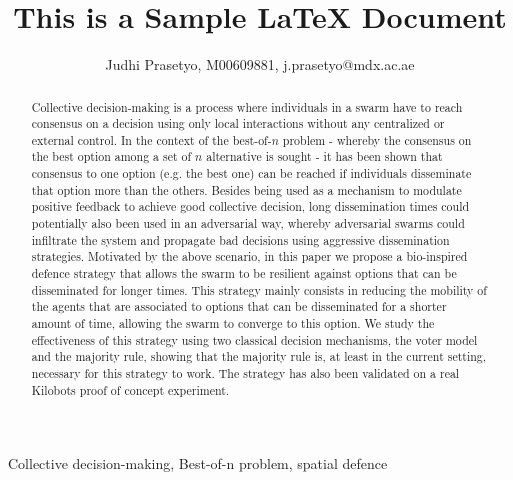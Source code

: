 \documentclass[journal]{IEEEtran}
\begin{document}
\title{This is a Sample LaTeX Document}

\author{Judhi Prasetyo, M00609881, j.prasetyo@mdx.ac.ae}


\maketitle

\begin{abstract}
Collective decision-making is a process where individuals in a swarm have to reach consensus on a decision using only local interactions without any centralized or external control. In the context of the best-of-$n$ problem - whereby the consensus on the best option among a set of $n$ alternative is sought - it has been shown that consensus to one option (e.g. the best one) can be reached if individuals disseminate that option more than the others.
Besides being used as a mechanism to modulate positive feedback to achieve good collective decision, long dissemination times could potentially also been used in an adversarial way, whereby adversarial swarms could infiltrate the system and propagate bad decisions using aggressive dissemination strategies. Motivated by the above scenario, in this paper we propose a bio-inspired defence strategy that allows the swarm to be resilient against options that can be disseminated for longer times. This strategy mainly consists in reducing the mobility of the agents that are associated to options that can be disseminated for a shorter amount of time, allowing the swarm to converge to this option. 
We study the effectiveness of this strategy using two classical decision mechanisms, the voter model and the majority rule, showing that the majority rule is, at least in the current setting, necessary for this strategy to work. The strategy has also been validated on a real Kilobots proof of concept experiment. 
\end{abstract}

\begin{IEEEkeywords}
Collective decision-making, Best-of-n problem, spatial defence
\end{IEEEkeywords}
\end{document}
